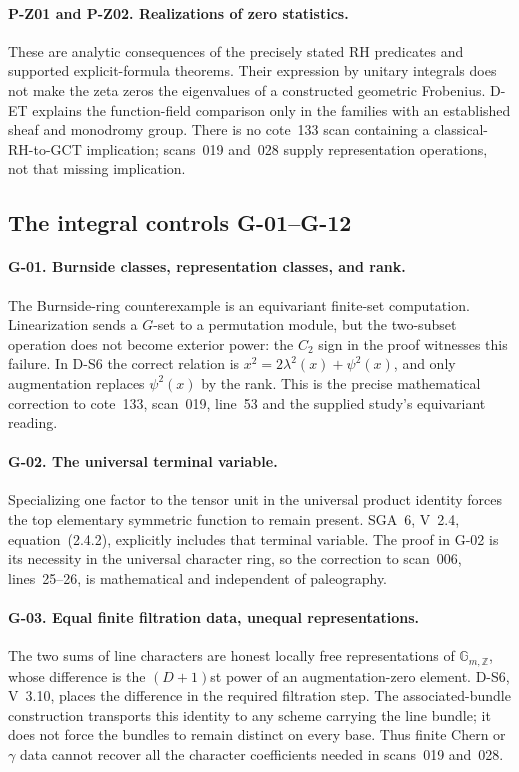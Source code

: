 \documentclass[11pt,a4paper]{article}
\theoremstyle{definition}\newtheorem{definition}{Definition}
\begin{document}
\paragraph{P-Z01 and P-Z02. Realizations of zero statistics.}
These are analytic consequences of the precisely stated RH predicates and supported explicit-formula theorems. Their expression by unitary integrals does not make the zeta zeros the eigenvalues of a constructed geometric Frobenius. D-ET explains the function-field comparison only in the families with an established sheaf and monodromy group. There is no cote~133 scan containing a classical-RH-to-GCT implication; scans~019 and~028 supply representation operations, not that missing implication.

\subsection{The integral controls G-01--G-12}

\paragraph{G-01. Burnside classes, representation classes, and rank.}
The Burnside-ring counterexample is an equivariant finite-set computation. Linearization sends a $G$-set to a permutation module, but the two-subset operation does not become exterior power: the $C_2$ sign in the proof witnesses this failure. In D-S6 the correct relation is $x^2=2\lambda^2(x)+\psi^2(x)$, and only augmentation replaces $\psi^2(x)$ by the rank. This is the precise mathematical correction to cote~133, scan~019, line~53 and the supplied study's equivariant reading.

\paragraph{G-02. The universal terminal variable.}
Specializing one factor to the tensor unit in the universal product identity forces the top elementary symmetric function to remain present. SGA~6, V~2.4, equation~(2.4.2), explicitly includes that terminal variable. The proof in G-02 is its necessity in the universal character ring, so the correction to scan~006, lines~25--26, is mathematical and independent of paleography.

\paragraph{G-03. Equal finite filtration data, unequal representations.}
The two sums of line characters are honest locally free representations of $\mathbb G_{m,\mathbb Z}$, whose difference is the $(D+1)$st power of an augmentation-zero element. D-S6, V~3.10, places the difference in the required filtration step. The associated-bundle construction transports this identity to any scheme carrying the line bundle; it does not force the bundles to remain distinct on every base. Thus finite Chern or $\gamma$ data cannot recover all the character coefficients needed in scans~019 and~028.
\end{document}
